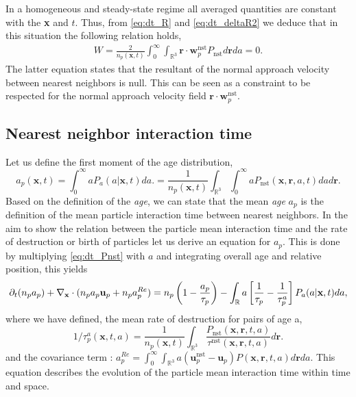 In a homogeneous and steady-state regime all averaged quantities are constant with the \textbf{x} and $t$.   
Thus, from \ref{eq:dt_R} and \ref{eq:dt_deltaR2} we deduce that in this situation the following relation holds, 
\begin{align}
    W = \frac{2}{n_p(\textbf{x},t)}
    \int_{0}^\infty
    \int_{\mathbb{R}^3} 
        \textbf{r} \cdot \textbf{w}^\text{nst}_p
    P_\text{nst}
    d\textbf{r}
    da = 0. 
    \label{eq:cdt_for_W}
\end{align}
The latter equation states that the resultant of the normal approach velocity between nearest neighbors is null. 
This can be seen as a constraint to be respected for the normal approach velocity field $\textbf{r}\cdot \textbf{w}_p^\text{nst}$. 



\subsection{Nearest neighbor interaction time}

Let us define the first moment of the age distribution,
\begin{equation}
    a_p(\textbf{x},t) 
    = \int_{0}^{\infty} a P_a(a|\textbf{x},t) da. 
    = \frac{1}{n_p(\textbf{x},t)}
    \int_{\mathbb{R}^3}
    \int_{0}^{\infty} 
    a P_\text{nst}(\textbf{x},\textbf{r},a,t) da d\textbf{r}. 
    \label{eq:a_p}
\end{equation}
Based on the definition of the \textit{age}, we can state that the mean \textit{age} $a_p$ is the definition of the mean particle interaction time between nearest neighbors.  
In the aim to show the relation between the particle mean interaction time and the rate of destruction or birth of particles let us derive an equation for $a_p$. 
This is done by multiplying \ref{eq:dt_Pnst} with $a$ and integrating overall age and relative position, this yields
\begin{equation}
    \pddt (n_p a_p)
    + \pddx \cdot  (n_p a_p \textbf{u}_p + n_p a_p^{Re})
    = 
    n_p\left(1
    - \frac{a_p}{\tau_p}\right)
    - \int_{\mathbb{R}} a \left[
        \frac{1}{\tau_p}
        - \frac{1}{\tau_p^a}
    \right]P_a(a|\textbf{x},t) da,
    \label{eq:dt_a_p}
\end{equation}
where we have defined, the mean rate of destruction for pairs of age a, 
\begin{equation*}
    1/\tau_p^a(\textbf{x},t,a) 
    = \frac{1}{n_p(\textbf{x},t)}\int_{\mathbb{R}^3} \frac{P_\text{nst}(\textbf{x},\textbf{r},t,a)}{\tau^\text{nst}(\textbf{x},\textbf{r},t,a)} d\textbf{r}.
\end{equation*}
and the covariance term : $a^{Re}_p = \int_{0}^\infty\int_{\mathbb{R}^3} a (\textbf{u}^\text{nst}_p - \textbf{u}_p) P(\textbf{x},\textbf{r},t,a) d\textbf{r}da$. 
This equation describes the evolution of the particle mean interaction time within time and space. 

